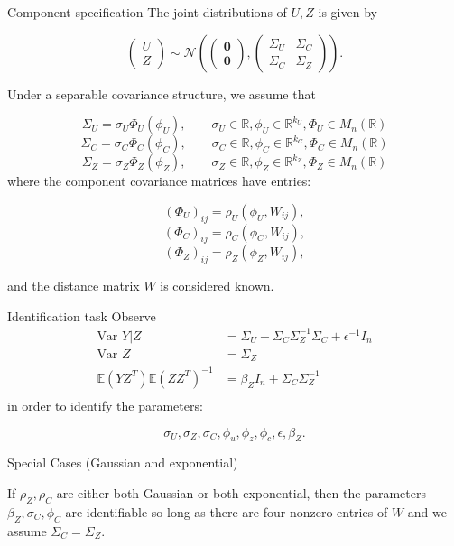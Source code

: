 \documentclass[10 pt]{beamer}
\newcommand{\R}{{\mathbb R}}
\newcommand{\E}{{\mathbb E}}
\newcommand{\Var}{\text{Var }}
\begin{document}
\begin{frame}{Component specification }
The joint distributions of $U, Z$ is given by

\[\begin{pmatrix}U \\ Z\end{pmatrix} \sim \mathcal{N} \left(\begin{pmatrix}\mathbf{0} \\ \mathbf{0} \end{pmatrix}, \begin{pmatrix}\Sigma_U & \Sigma_{C} \\ \Sigma_{C} & \Sigma_{Z}\end{pmatrix} \right).\]

Under a separable covariance structure, we assume that

\[\Sigma_U = \sigma_U \Phi_U(\phi_U), \qquad\sigma_U \in \R, \phi_U \in \R^{k_U}, \Phi_U\in M_n(\R)\]
\[\Sigma_{C} = \sigma_{C} \Phi_{C}(\phi_{C}), \qquad\sigma_C \in \R, \phi_{C} \in \R^{k_{C}},\Phi_C\in M_n(\R)\]
\[\Sigma_Z = \sigma_Z \Phi_Z(\phi_Z), \qquad\sigma_Z \in \R, \phi_Z \in \R^{k_Z},\Phi_Z\in M_n(\R)\]
where the component covariance matrices have entries:

\[(\Phi_U)_{ij} = \rho_U(\phi_U,W_{ij}), \]
\[(\Phi_C)_{ij} = \rho_{C}(\phi_C, W_{ij}), \]
\[(\Phi_Z)_{ij} = \rho_{Z}(\phi_Z, W_{ij}), \]

and the distance matrix $W$ is considered known.

\end{frame}

\begin{frame}{Identification task}
Observe
\begin{align}
\Var Y|Z &= \Sigma_U - \Sigma_{C}\Sigma_Z^{-1} \Sigma_C + \epsilon^{-1} I_n \nonumber\\
\Var Z &= \Sigma_Z \nonumber\\
\E(YZ^T) \E(ZZ^T)^{-1} &= \beta_Z I_n + \Sigma_C \Sigma_Z^{-1} \nonumber \\
\end{align}
in order to identify the parameters:

\[\sigma_U, \sigma_Z, \sigma_C, \phi_u, \phi_z, \phi_c, \epsilon, \beta_Z.\]
\end{frame}




\begin{frame}{Special Cases (Gaussian and exponential)}

If $\rho_Z, \rho_C$ are either both Gaussian or both exponential, then the parameters $\beta_Z, \sigma_C, \phi_C$ are identifiable so long as there are four nonzero entries of $W$ and we assume $\Sigma_C = \Sigma_Z$. \\

\end{frame}
\end{document}
